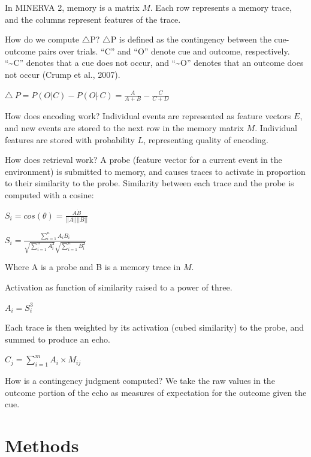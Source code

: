 \documentclass[
  english,
  man,floatsintext]{apa6}
\begin{document}
In MINERVA 2, memory is a matrix \(M\). Each row represents a memory trace, and the columns represent features of the trace.

How do we compute \(\triangle\)P? \(\triangle\)P is defined as the contingency between the cue-outcome pairs over trials. \enquote{C} and \enquote{O} denote cue and outcome, respectively. \enquote{\textasciitilde C} denotes that a cue does not occur, and \enquote{\textasciitilde O} denotes that an outcome does not occur (Crump et al., 2007).

\(\triangle\ P = P(O|C) - P(O| \tilde\ C) = \frac{A}{A+B} - \frac{C}{C+D}\)

How does encoding work? Individual events are represented as feature vectors \(E\), and new events are stored to the next row in the memory matrix \(M\). Individual features are stored with probability \(L\), representing quality of encoding.

How does retrieval work? A probe (feature vector for a current event in the environment) is submitted to memory, and causes traces to activate in proportion to their similarity to the probe. Similarity between each trace and the probe is computed with a cosine:

\(S_i = cos(\theta) = \frac{A \dot B}{||A|| ||B||}\)

\(S_i = \frac{\sum_{i=1}^n A_iB_i}{\sqrt{\sum_{i=1}^n A_i^2}\sqrt{\sum_{i=1}^n B_i^2}}\)

Where A is a probe and B is a memory trace in \(M\).

Activation as function of similarity raised to a power of three.

\(A_i = S_i^3\)

Each trace is then weighted by its activation (cubed similarity) to the probe, and summed to produce an echo.

\(C_j = \sum_{i=1}^m A_i \times M_{ij}\)

How is a contingency judgment computed? We take the raw values in the outcome portion of the echo as measures of expectation for the outcome given the cue.

\hypertarget{methods}{%
\section{Methods}\label{methods}}
\end{document}
